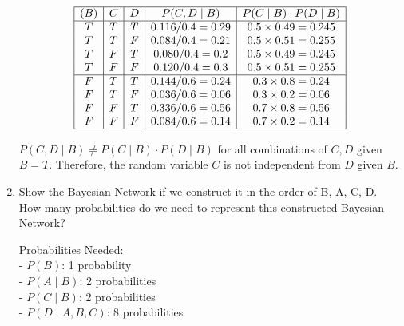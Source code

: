 \documentclass[12pt]{article}
\begin{document}
\begin{enumerate}[font=\Large,label=(\alph*)]
	      $$
		      \begin{array}{|c|c|c|c|c|}
			      \hline
			      (B) & C & D & P(C, D \mid B)   & P(C \mid B) \cdot P(D \mid B) \\
			      \hline
			      T   & T & T & 0.116/0.4 = 0.29 & 0.5 \times 0.49 = 0.245       \\
			      T   & T & F & 0.084/0.4 = 0.21 & 0.5 \times 0.51 = 0.255       \\
			      T   & F & T & 0.080/0.4 = 0.2  & 0.5 \times 0.49 = 0.245       \\
			      T   & F & F & 0.120/0.4 = 0.3  & 0.5 \times 0.51 = 0.255       \\
			      \hline
			      F   & T & T & 0.144/0.6 = 0.24 & 0.3 \times 0.8 = 0.24         \\
			      F   & T & F & 0.036/0.6 = 0.06 & 0.3 \times 0.2 = 0.06         \\
			      F   & F & T & 0.336/0.6 = 0.56 & 0.7 \times 0.8 = 0.56         \\
			      F   & F & F & 0.084/0.6 = 0.14 & 0.7 \times 0.2 = 0.14         \\
			      \hline
		      \end{array}
	      $$

	      $P(C, D \mid B) \neq P(C \mid B) \cdot P(D \mid B)$ for all combinations of $C,D$ given $B=T$. Therefore, the random variable $C$ is not independent from $D$ given $B$.

	      \newpage
	\item Show the Bayesian Network if we construct it in the order of B, A, C, D. How many probabilities do we need to represent this constructed Bayesian Network?
	      \begin{center}
	      \end{center}

	      Probabilities Needed:\\
	      - $ P(B) $: 1 probability\\
	      - $ P(A \mid B) $: 2 probabilities\\
	      - $ P(C \mid B) $: 2 probabilities\\
	      - $ P(D \mid A, B, C) $: 8 probabilities


\end{enumerate}
\end{document}
